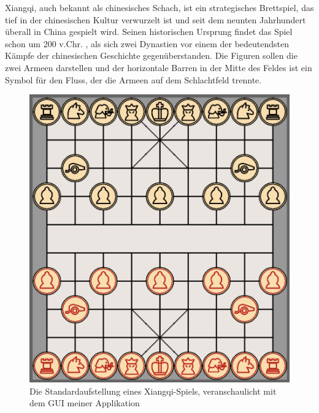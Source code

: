\documentclass{jpp}
\begin{document}
Xiangqi, auch bekannt als chinesisches Schach, ist ein strategisches Brettspiel, das tief in der chinesischen Kultur verwurzelt ist und seit dem neunten Jahrhundert überall in China gespielt wird. Seinen historischen Ursprung findet das Spiel schon um 200 v.Chr. , als sich zwei Dynastien vor einem der bedeutendsten Kämpfe der chinesischen Geschichte gegenüberstanden. Die Figuren sollen die zwei Armeen darstellen und der horizontale Barren in der Mitte des Feldes ist ein Symbol für den Fluss, der die Armeen auf dem Schlachtfeld trennte. 
\begin{figure}
  \centering
  \begin{minipage}{0.49\textwidth}
    \includegraphics[width=\textwidth]{imgs/board.png}
    \caption{Die Standardaufstellung eines Xiangqi-Spiels, veranschaulicht mit dem GUI meiner Applikation}
    \label{fig:board}
  \end{minipage}
  \hfill
  \begin{minipage}{0.49\textwidth}

\end{minipage}
\end{figure}
\end{document}
